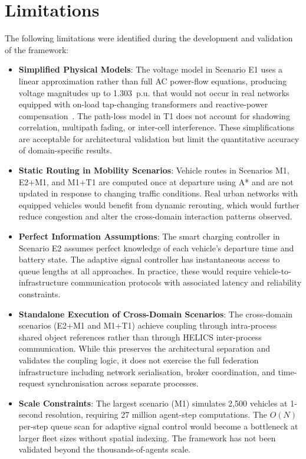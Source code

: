 \section{Limitations}

The following limitations were identified during the development and validation of the framework:

\begin{itemize}
    \item \textbf{Simplified Physical Models}: The voltage model in Scenario E1 uses a linear approximation rather than full AC power-flow equations, producing voltage magnitudes up to 1.303~p.u. that would not occur in real networks equipped with on-load tap-changing transformers and reactive-power compensation~\cite{pandapower}. The path-loss model in T1 does not account for shadowing correlation, multipath fading, or inter-cell interference. These simplifications are acceptable for architectural validation but limit the quantitative accuracy of domain-specific results.

    \item \textbf{Static Routing in Mobility Scenarios}: Vehicle routes in Scenarios M1, E2+M1, and M1+T1 are computed once at departure using A* and are not updated in response to changing traffic conditions. Real urban networks with equipped vehicles would benefit from dynamic rerouting, which would further reduce congestion and alter the cross-domain interaction patterns observed.

    \item \textbf{Perfect Information Assumptions}: The smart charging controller in Scenario E2 assumes perfect knowledge of each vehicle's departure time and battery state. The adaptive signal controller has instantaneous access to queue lengths at all approaches. In practice, these would require vehicle-to-infrastructure communication protocols with associated latency and reliability constraints.

    \item \textbf{Standalone Execution of Cross-Domain Scenarios}: The cross-domain scenarios (E2+M1 and M1+T1) achieve coupling through intra-process shared object references rather than through HELICS inter-process communication. While this preserves the architectural separation and validates the coupling logic, it does not exercise the full federation infrastructure including network serialisation, broker coordination, and time-request synchronisation across separate processes.

    \item \textbf{Scale Constraints}: The largest scenario (M1) simulates 2{,}500 vehicles at 1-second resolution, requiring 27 million agent-step computations. The $O(N)$ per-step queue scan for adaptive signal control would become a bottleneck at larger fleet sizes without spatial indexing. The framework has not been validated beyond the thousands-of-agents scale.


\end{itemize}
